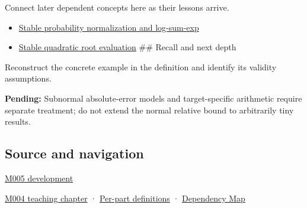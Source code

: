 Connect later dependent concepts here as their lessons arrive.

\begin{itemize}
\tightlist
\item
  \hyperref[appendix-d580b422240f]{Stable probability normalization and log-sum-exp}
\item
  \hyperref[appendix-b9afba7f63e5]{Stable quadratic root evaluation} \#\# Recall and next depth
\end{itemize}

Reconstruct the concrete example in the definition and identify its validity assumptions.

\textbf{Pending:} Subnormal absolute-error models and target-specific arithmetic require separate treatment; do not extend the normal relative bound to arbitrarily tiny results.

\subsection{Source and navigation}\label{appendix-bc44f7b42f42-source-and-navigation}

\hyperref[01-foundations-i-ch001-when-arithmetic-meets-uncertainty]{M005 development}

\hyperref[01-foundations-i-ch001-a-stretching-ruler-for-real-valued-quantities]{M004 teaching chapter} · \hyperref[appendix-fd090d982a15-m004---parts-61-76]{Per-part definitions} · \hyperref[appendix-4ad47bdd269a]{Dependency Map}
